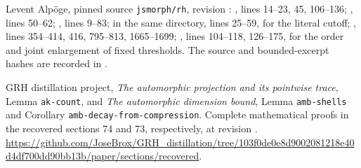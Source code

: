 Levent Alp\"oge, pinned source \texttt{jsmorph/rh}, revision
:
,
lines 14--23, 45, 106--136;
, lines 50--62;
,
lines 9--83;
 in the same directory, lines 25--59,
for the literal cutoff;
,
lines 354--414, 416, 795--813, 1665--1699;
,
lines 104--118, 126--175, for the order and joint enlargement of fixed thresholds.
The source and bounded-excerpt hashes are recorded in
.


GRH distillation project, \emph{The automorphic projection and its
pointwise trace}, Lemma \texttt{ak-count}, and
\emph{The automorphic dimension bound}, Lemma \texttt{amb-shells}
and Corollary \texttt{amb-decay-from-compression}.
Complete mathematical proofs in the recovered sections 74 and 73,
respectively, at revision
.
\url{https://github.com/JoseBrox/GRH_distillation/tree/103f0de0e8d9002081218e40d4df700dd90bb13b/paper/sections/recovered}.
